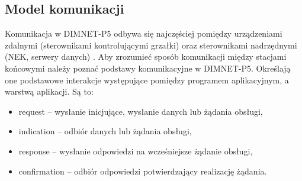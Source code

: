\subsection{Model komunikacji}
Komunikacja w \mbox{DIMNET-P5} odbywa się najczęściej pomiędzy urządzeniami zdalnymi (sterownikami kontrolującymi grzałki) oraz sterownikami nadrzędnymi (NEK, serwery danych) \cite{dimnetp5-spec}. Aby zrozumieć sposób komunikacji między stacjami końcowymi należy poznać podstawy komunikacyjne w \mbox{DIMNET-P5}. Określają one podstawowe interakcje występujące pomiędzy programem aplikacyjnym, a warstwą aplikacji. Są to:
\begin{itemize}
\item request -- wysłanie inicjujące, wysłanie danych lub żądania obsługi,
\item indication -- odbiór danych lub żądania obsługi,
\item response -- wysłanie odpowiedzi na wcześniejsze żądanie obsługi,
\item confirmation -- odbiór odpowiedzi potwierdzający realizację żądania.
\end{itemize}


